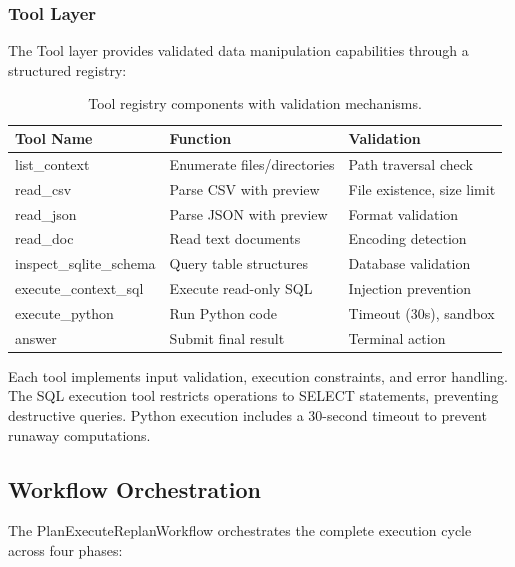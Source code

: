 \documentclass{article}
\theoremstyle{definition}
\begin{document}
\subsubsection{Tool Layer}

The Tool layer provides validated data manipulation capabilities through a structured registry:

\begin{table}[t]
\centering
\caption{Tool registry components with validation mechanisms.}
\label{tab:tools}
\begin{tabular}{lll}
\toprule
Tool Name & Function & Validation \\
\midrule
list\_context & Enumerate files/directories & Path traversal check \\
read\_csv & Parse CSV with preview & File existence, size limit \\
read\_json & Parse JSON with preview & Format validation \\
read\_doc & Read text documents & Encoding detection \\
inspect\_sqlite\_schema & Query table structures & Database validation \\
execute\_context\_sql & Execute read-only SQL & Injection prevention \\
execute\_python & Run Python code & Timeout (30s), sandbox \\
answer & Submit final result & Terminal action \\
\bottomrule
\end{tabular}
\end{table}

Each tool implements input validation, execution constraints, and error handling. The SQL execution tool restricts operations to SELECT statements, preventing destructive queries. Python execution includes a 30-second timeout to prevent runaway computations.

\subsection{Workflow Orchestration}

The PlanExecuteReplanWorkflow orchestrates the complete execution cycle across four phases:
\end{document}

